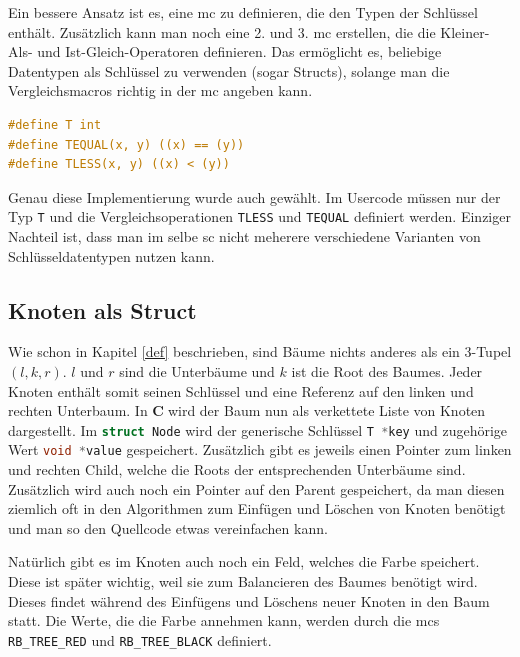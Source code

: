 \documentclass[11pt]{article}
\newcommand{\lstin}[1]{\lstinline[language=C]{#1}}
\newcommand{\cpl}{\textbf{C}$\;$}
\begin{document}
Ein bessere Ansatz ist es, eine \gls{mc} zu definieren, die den Typen der Schlüssel enthält. Zusätzlich kann man noch eine 2. und 3. \gls{mc} erstellen, die die Kleiner-Als- und Ist-Gleich-Operatoren definieren.
Das ermöglicht es, beliebige Datentypen als Schlüssel zu verwenden (sogar Structs), solange man die Vergleichsmacros richtig in der \gls{mc} angeben kann.

\begin{lstlisting}[language=C]
#define T int
#define TEQUAL(x, y) ((x) == (y))
#define TLESS(x, y) ((x) < (y))
\end{lstlisting}

Genau diese Implementierung wurde auch gewählt. Im Usercode müssen nur der Typ \lstin{T} und die Vergleichsoperationen \lstin{TLESS} und \lstin{TEQUAL} definiert werden. Einziger Nachteil ist, dass man im selbe \gls{sc} nicht meherere verschiedene Varianten von Schlüsseldatentypen nutzen kann.

\subsection{Knoten als Struct}
Wie schon in Kapitel \ref{def} beschrieben, sind Bäume nichts anderes als ein 3-Tupel $(l, k, r)$.
$l$ und $r$ sind die Unterbäume und $k$ ist die Root des Baumes.
Jeder Knoten enthält somit seinen Schlüssel und eine Referenz auf den linken und rechten Unterbaum.
In \cpl wird der Baum nun als verkettete Liste von Knoten dargestellt.
Im \lstin{struct Node} wird der generische Schlüssel \lstin{T *key} und zugehörige Wert \lstin{void *value} gespeichert.
Zusätzlich gibt es jeweils einen Pointer zum linken und rechten Child, welche die Roots der entsprechenden Unterbäume sind. Zusätzlich wird auch noch ein Pointer auf den Parent gespeichert,
da man diesen ziemlich oft in den Algorithmen zum Einfügen und Löschen von Knoten benötigt und man so den Quellcode etwas vereinfachen kann.

Natürlich gibt es im Knoten auch noch ein Feld, welches die Farbe speichert. Diese ist später wichtig, weil sie zum Balancieren des Baumes benötigt wird.
Dieses findet während des Einfügens und Löschens neuer Knoten in den Baum statt. Die Werte, die die Farbe annehmen kann, werden durch die \glspl{mc} \lstin{RB_TREE_RED} und \lstin{RB_TREE_BLACK} definiert.
\end{document}
